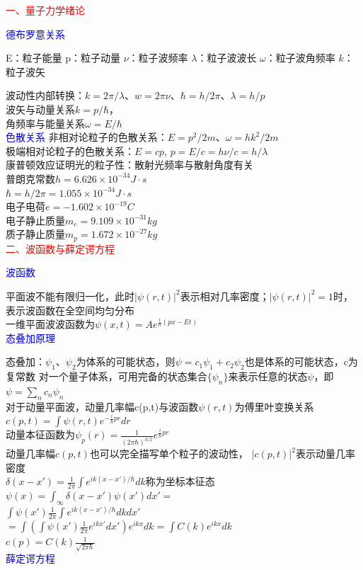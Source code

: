 \documentclass[a4paper,8pt]{extarticle} %
\newcommand{\bluetext}[1]{\textcolor{blue}{#1}}
\newcommand{\redtext}[1]{\textcolor{red}{#1}}
\begin{document}
\begin{multicols}{3}

\redtext{一、量子力学绪论}

\bluetext{德布罗意关系}

E：粒子能量 p：粒子动量 $\nu$：粒子波频率 $\lambda$：粒子波波长 $\omega$：粒子波角频率 $k$：粒子波矢

波动性内部转换：$k=2\pi/\lambda$、$w=2\pi\nu$、$\hbar=h/2\pi$、$\lambda=h/p$\\
波矢与动量关系$k=p/\hbar$，\\
角频率与能量关系$\omega=E/\hbar$ \\
\bluetext{色散关系}
非相对论粒子的色散关系：$E = p^2/2m$、$\omega=hk^2/2m$\\
极端相对论粒子的色散关系：$E = cp$,
$p=E/c=h\nu/c=h/\lambda$\\
康普顿效应证明光的粒子性：散射光频率与散射角度有关\\
普朗克常数$h = 6.626 \times 10^{-34}J \cdot s$\\
$\hbar = h/2\pi = 1.055 \times 10^{-34}J \cdot s$\\
电子电荷$e = -1.602 \times 10^{-19}C$\\
电子静止质量$m_e = 9.109 \times 10^{-31}kg$\\
质子静止质量$m_p = 1.672 \times 10^{-27}kg$\\
\redtext{二、波函数与薛定谔方程}

\bluetext{波函数}

平面波不能有限归一化，此时$|\psi(r, t)|^2$表示相对几率密度；$|\psi(r, t)|^2 = 1$时，表示波函数在全空间均匀分布\\
一维平面波波函数为$\psi(x, t) = Ae^{\frac{i}{\hbar}(px-E t)}$\\
\bluetext{态叠加原理}

态叠加：$\psi_1、\psi_2$为体系的可能状态，则$\psi=c_1\psi_1+c_2\psi_2$也是体系的可能状态，c为复常数
对一个量子体系，可用完备的状态集合${\{\psi_n\}}$来表示任意的状态$\psi$，即$\psi=\sum_n c_n\psi_n$\\
对于动量平面波，动量几率幅c(p,t)与波函数$\psi(r,t)$为傅里叶变换关系$c(p,t)=\int\psi(r,t)e^{-\frac{i}{\hbar}pr}dr$\\
动量本征函数为$\psi_p(r)=\frac{1}{(2\pi\hbar)^{3/2}}e^{\frac{i}{\hbar}pr}$\\
动量几率幅$c(p,t)$也可以完全描写单个粒子的波动性， $|c(p,t)|^2$表示动量几率密度\\
$\delta(x-x')=\frac{1}{2\pi}\int e^{ik(x-x')/\hbar}dk$称为坐标本征态\\
$\psi(x)=\int_\infty\delta(x-x')\psi(x')dx'= $\\$\int\psi(x')\frac{1}{2\pi}\int e^{ik(x-x')/\hbar}dkdx'$\\
$ = \int(\int\psi(x')\frac{1}{2\pi}e^{ikx'}dx')e^{ikx}dk=\int C(k)e^{ikx}dk $\\
$c(p)=C(k)\frac{1}{\sqrt{2\pi\hbar}}$\\
\bluetext{薛定谔方程}


\end{multicols}
\end{document}
